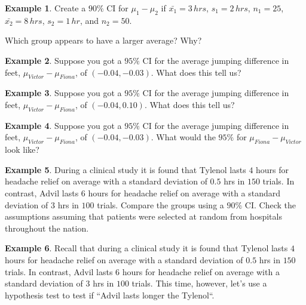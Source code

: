 \documentclass[12pt]{amsart}
\theoremstyle{definition}
\newtheorem{ex}{Example}
\begin{document}
\begin{ex} Create a $90\%$ CI for $\mu_1-\mu_2$ if $\bar{x_1}=3\,hrs$, $s_1=2\,hrs$, $n_1=25$, $\bar{x_2}=8\,hrs$, $s_2=1\,hr$, and $n_2=50$.
\end{ex}

\vspace{2in}

Which group appears to have a larger average? Why?

\vspace{.25in}

\newpage
 \begin{ex} Suppose you got a $95\%$ CI for the average jumping difference in feet, $\mu_{Victor}-\mu_{Fiona}$, of $(-0.04,-0.03)$. What does this tell us?
 \end{ex}
 
 \vfill
 
\begin{ex} Suppose you got a $95\%$ CI for the average jumping difference in feet, $\mu_{Victor}-\mu_{Fiona}$, of $(-0.04,0.10)$. What does this tell us?
 \end{ex}
 
 \vfill
 
 \begin{ex} Suppose you got a $95\%$ CI for the average jumping difference in feet, $\mu_{Victor}-\mu_{Fiona}$, of $(-0.04,-0.03)$.  What would the $95\%$ for $\mu_{Fiona}-\mu_{Victor}$ look like?\end{ex}
 
 \vfill

 
 \begin{ex} During a clinical study it is found that Tylenol lasts $4$ hours for headache relief on average with a standard deviation of $0.5$ hrs in $150$ trials. In contrast, Advil lasts $6$ hours for headache relief on average with a standard deviation of $3$ hrs in $100$ trials. Compare the groups using a $90\%$ CI. Check the assumptions assuming that patients were selected at random from hospitals throughout the nation. \end{ex}
 \vfill
 \vfill
 \newpage
\begin{ex} Recall that during a clinical study it is found that Tylenol lasts $4$ hours for headache relief on average with a standard deviation of $0.5$ hrs in $150$ trials. In contrast, Advil lasts $6$ hours for headache relief on average with a standard deviation of $3$ hrs in $100$ trials. This time, however, let's use a hypothesis test to test if ``Advil lasts longer the Tylenol``.\end{ex}
\end{document}
